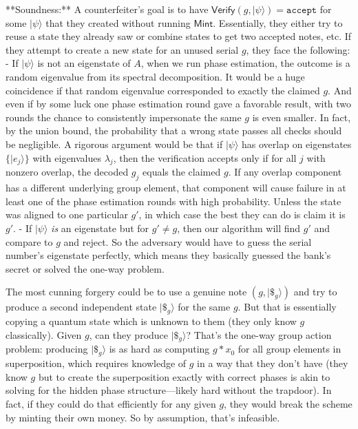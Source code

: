 \documentclass[11pt]{article}
\theoremstyle{definition}
\begin{document}
    **Soundness:** A counterfeiter’s goal is to have $\mathsf{Verify}(g, |\psi\rangle) = \texttt{accept}$ for some $|\psi\rangle$ that they created without running $\mathsf{Mint}$. Essentially, they either try to reuse a state they already saw or combine states to get two accepted notes, etc. If they attempt to create a new state for an unused serial $g$, they face the following:
    - If $|\psi\rangle$ is not an eigenstate of $A$, when we run phase estimation, the outcome is a random eigenvalue from its spectral decomposition. It would be a huge coincidence if that random eigenvalue corresponded to exactly the claimed $g$. And even if by some luck one phase estimation round gave a favorable result, with two rounds the chance to consistently impersonate the same $g$ is even smaller. In fact, by the union bound, the probability that a wrong state passes all checks should be negligible. A rigorous argument would be that if $|\psi\rangle$ has overlap on eigenstates $\{|e_j\rangle\}$ with eigenvalues $\lambda_j$, then the verification accepts only if for all $j$ with nonzero overlap, the decoded $g_j$ equals the claimed $g$. If any overlap component has a different underlying group element, that component will cause failure in at least one of the phase estimation rounds with high probability. Unless the state was aligned to one particular $g'$, in which case the best they can do is claim it is $g'$.
    - If $|\psi\rangle$ \emph{is} an eigenstate but for $g' \neq g$, then our algorithm will find $g'$ and compare to $g$ and reject. So the adversary would have to guess the serial number’s eigenstate perfectly, which means they basically guessed the bank’s secret or solved the one-way problem.

    The most cunning forgery could be to use a genuine note $(g, |\$_g\rangle)$ and try to produce a second independent state $|\$_g\rangle$ for the same $g$. But that is essentially copying a quantum state which is unknown to them (they only know $g$ classically). Given $g$, can they produce $|\$_g\rangle$? That’s the one-way group action problem: producing $|\$_g\rangle$ is as hard as computing $g*x_0$ for all group elements in superposition, which requires knowledge of $g$ in a way that they don't have (they know $g$ but to create the superposition exactly with correct phases is akin to solving for the hidden phase structure—likely hard without the trapdoor). In fact, if they could do that efficiently for any given $g$, they would break the scheme by minting their own money. So by assumption, that’s infeasible.
\end{document}
